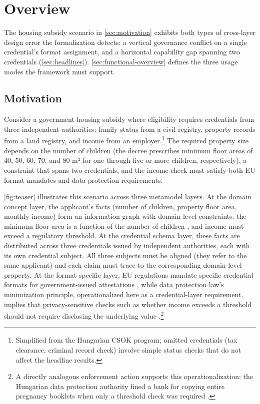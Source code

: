 \section{Overview}\label{sec:overview}

The housing subsidy scenario in \autoref{sec:motivation} exhibits both types of cross-layer design error the formalization detects: a vertical governance conflict on a single credential's format assignment, and a horizontal capability gap spanning two credentials (\autoref{sec:headlines}). \autoref{sec:functional-overview} defines the three usage modes the framework must support.

\subsection{Motivation}\label{sec:motivation}

Consider a government housing subsidy where eligibility requires credentials from three independent authorities: family status from a civil registry, property records from a land registry, and income from an employer.\footnote{Simplified from the Hungarian CSOK program; omitted credentials (tax clearance, criminal record check) involve simple status checks that do not affect the headline results.} The required property size depends on the number of children \citep{noauthor_5182023_2023} (the decree prescribes minimum floor areas of 40, 50, 60, 70, and 80 m² for one through five or more children, respectively), a constraint that spans two credentials, and the income check must satisfy both EU format mandates and data protection requirements.

\autoref{fig:teaser} illustrates this scenario across three metamodel layers. At the domain concept layer, the applicant's facts (number of children, property floor area, monthly income) form an information graph with domain-level constraints: the minimum floor area is a function of the number of children \citep{noauthor_5182023_2023}, and income must exceed a regulatory threshold. At the credential schema layer, these facts are distributed across three credentials issued by independent authorities, each with its own credential subject. All three subjects must be aligned (they refer to the same applicant) and each claim must trace to the corresponding domain-level property. At the format-specific layer, EU regulations mandate specific credential formats for government-issued attestations \citep{noauthor_eu-digital-identity-walleteudi-doc-architecture-and-reference-framework_2026}, while data protection law's minimization principle, operationalized here as a credential-layer requirement, implies that privacy-sensitive checks such as whether income exceeds a threshold should not require disclosing the underlying value \citep{gdpr}.\footnote{A directly analogous enforcement action supports this operationalization: the Hungarian data protection authority fined a bank for copying entire pregnancy booklets when only a threshold check was required \citep{noauthor_naih_2020}.}

